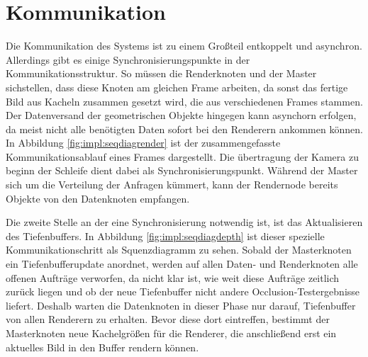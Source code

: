 \section{Kommunikation}
\label{sec:impl:kommunikation}
Die Kommunikation des Systems ist zu einem Großteil entkoppelt und asynchron. Allerdings gibt es einige Synchronisierungspunkte in der Kommunikationsstruktur. So müssen die Renderknoten und der Master sichstellen, dass diese Knoten am gleichen Frame arbeiten, da sonst das fertige Bild aus Kacheln zusammen gesetzt wird, die aus verschiedenen Frames stammen. Der Datenversand der geometrischen Objekte hingegen kann asynchorn erfolgen, da meist nicht alle benötigten Daten sofort bei den Renderern ankommen können. In Abbildung \ref{fig:impl:seqdiagrender} ist der zusammengefasste Kommunikationsablauf eines Frames dargestellt. Die übertragung der Kamera zu beginn der Schleife dient dabei als Synchronisierungspunkt. Während der Master sich um die Verteilung der Anfragen kümmert, kann der Rendernode bereits Objekte von den Datenknoten empfangen.

Die zweite Stelle an der eine Synchronisierung notwendig ist, ist das Aktualisieren des Tiefenbuffers. In Abbildung \ref{fig:impl:seqdiagdepth} ist dieser spezielle Kommunikationschritt als Squenzdiagramm zu sehen. Sobald der Masterknoten ein Tiefenbufferupdate anordnet, werden auf allen Daten- und Renderknoten alle offenen Aufträge verworfen, da nicht klar ist, wie weit diese Aufträge zeitlich zurück liegen und ob der neue Tiefenbuffer nicht andere Occlusion-Testergebnisse liefert. Deshalb warten die Datenknoten in dieser Phase nur darauf, Tiefenbuffer von allen Renderern zu erhalten. Bevor diese dort eintreffen, bestimmt der Masterknoten neue Kachelgrößen für die Renderer, die anschließend erst ein aktuelles Bild in den Buffer rendern können.

